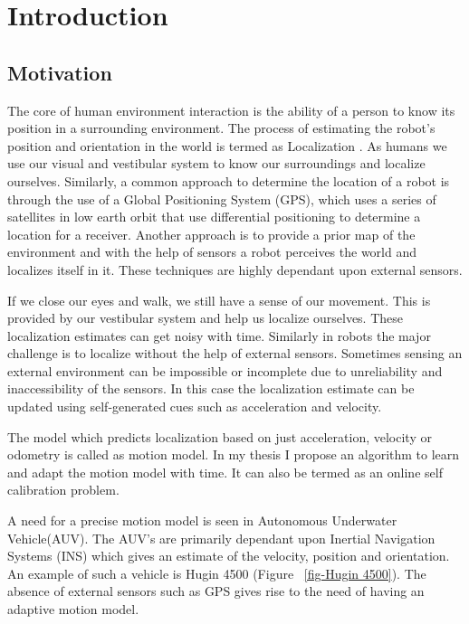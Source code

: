 \documentclass[12pt]{dalcsthesis}
\begin{document}
\mainmatter

\chapter{Introduction}
 





\section{Motivation}
The core of human environment interaction is the ability of a person to know its position in a surrounding environment. The process of estimating the robot's position and orientation in the world is termed as Localization \cite{thrun2005probabilistic}. As humans we use our visual and vestibular system to know our surroundings and localize ourselves. Similarly, a common approach to determine the location of a robot is through the use of a Global Positioning System (GPS), which uses a series of satellites in low earth orbit that use differential positioning to determine a location for a receiver. Another approach is to provide a prior map of the environment and with the help of sensors a robot perceives the world and localizes itself in it. These techniques are highly dependant upon external sensors.

If we close our eyes and walk, we still have a sense of our movement. This is provided by our vestibular system and help us localize ourselves. These localization estimates can get noisy with time. Similarly in robots the major challenge is to localize without the help of external sensors. Sometimes sensing an external environment can be impossible or incomplete due to unreliability and inaccessibility of the sensors. In this case the localization estimate can be updated using self-generated cues such as acceleration and velocity. 

The model which predicts localization based on just acceleration, velocity or odometry is called as motion model. In my thesis I propose an algorithm to learn and adapt the motion model with time. It can also be termed as an online self calibration problem. 

A need for a precise motion model is seen in Autonomous Underwater Vehicle(AUV). The AUV's are primarily dependant upon Inertial Navigation Systems (INS) which gives an estimate of the velocity, position and orientation. An example of such a vehicle is Hugin 4500 (Figure ~\ref{fig-Hugin 4500}). The absence of external sensors such as GPS gives rise to the need of having an adaptive motion model.
\end{document}
